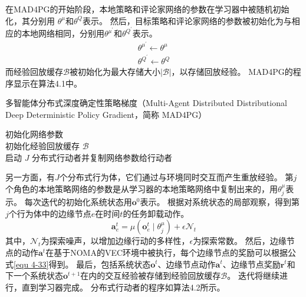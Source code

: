 在MAD4PG的开始阶段，本地策略和评论家网络的参数在学习器中被随机初始化，其分别用 $\theta^{\mu}$和$\theta^{Q}$表示。
然后，目标策略和评论家网络的参数被初始化为与相应的本地网络相同，分别用$\theta^{\mu^{\prime}}$和$\theta^{Q^{\prime}}$表示。
\begin{align}
	\theta^{\mu^{\prime}} \leftarrow \theta^{\mu}\\
	\theta^{Q^{\prime}} \leftarrow \theta^{Q}
\end{align}
而经验回放缓存$\mathcal{B}$被初始化为最大存储大小$|\mathcal{B}|$，以存储回放经验。
MAD4PG的程序显示在算法4.1中。


\begin{algorithm}[h]
\renewcommand{\algorithmcfname}{算法}
	\caption{多智能体分布式深度确定性策略梯度（Multi-Agent Distributed Distributional Deep Deterministic Policy Gradient，简称 MAD4PG）}
	初始化网络参数\\
	初始化经验回放缓存 $\mathcal{B}$\\
	启动 $J$ 分布式行动者并复制网络参数给行动者\\
\end{algorithm}

另一方面，有$J$个分布式行为体，它们通过与环境同时交互而产生重放经验。
第$j$个角色的本地策略网络的参数是从学习器的本地策略网络中复制出来的，用$\theta^{\mu}_{j}$表示。
每次迭代的初始化系统状态用$\boldsymbol{o}^{0}$表示。
根据对系统状态的局部观察，得到第$j$个行为体中的边缘节点$e$在时间$t$的任务卸载动作。
\begin{equation}
	\boldsymbol{a}_{e}^{t}={\mu}\left(\boldsymbol{o}_{e}^{t} \mid \theta^{\mu}_{j}\right)+\epsilon  \mathcal{N}_{t}
\end{equation}
\noindent 其中，$\mathcal{N}_{t}$为探索噪声，以增加边缘行动的多样性，$\epsilon$为探索常数。
然后，边缘节点的动作$\boldsymbol{a}^{t}$在基于NOMA的VEC环境中被执行，每个边缘节点的奖励可以根据公式\ref{equ 4-33}得到。
最后，包括系统状态$\boldsymbol{o}^{t}$、边缘节点动作$\boldsymbol{a}^{t}$、边缘节点奖励$\boldsymbol{r}^{t}$和下一个系统状态$\boldsymbol{o}^{t+1}$在内的交互经验被存储到经验回放缓存$\mathcal{B}$。
迭代将继续进行，直到学习器完成。
分布式行动者的程序如算法4.2所示。

